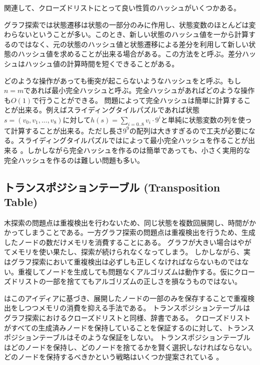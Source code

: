 関連して、クローズドリストにとって良い性質のハッシュがいくつかある。

グラフ探索では状態遷移は状態の一部分のみに作用し、状態変数のほとんどは変わらないということが多い。このとき、新しい状態のハッシュ値を一から計算するのではなく、元の状態のハッシュ値と状態遷移による差分を利用して新しい状態のハッシュ値を求めることが出来る場合がある。この方法をと呼ぶ。差分ハッシュはハッシュ値の計算時間を短くできることがある。

どのような操作があっても衝突が起こらないようなハッシュをと呼ぶ。もし$n = m$であれば最小完全ハッシュと呼ぶ。完全ハッシュがあればどのような操作も$O(1)$で行うことができる。
問題によって完全ハッシュは簡単に計算することが出来る。例えばスライディングタイルパズルであれば状態$s = (v_0, v_1,...,v_8)$に対して$h(s) = \sum_{i = 0..8} v_i \cdot 9^i$と単純に状態変数の列を使って計算することが出来る。ただし長さ$9^9$の配列は大きすぎるので工夫が必要になる。スライディングタイルパズルではによって最小完全ハッシュを作ることが出来る \cite{korf2005large}。しかしながら完全ハッシュを作るのは簡単であっても、小さく実用的な完全ハッシュを作るのは難しい問題も多い。


\subsection{トランスポジションテーブル (Transposition Table)}

木探索の問題点は重複検出を行わないため、同じ状態を複数回展開し、時間がかかってしまうことである。一方グラフ探索の問題点は重複検出を行うため、生成したノードの数だけメモリを消費することにある。
グラフが大きい場合はやがてメモリを使い果たし、探索が続けられなくなってしまう。
しかしながら、実はグラフ探索において重複検出は必ずしも正しくなければならないものではない。重複してノードを生成しても問題なくアルゴリズムは動作する。仮にクローズドリストの一部を捨ててもアルゴリズムの正しさを損なうものではない。

はこのアイディアに基づき、展開したノードの一部のみを保存することで重複検出をしつつメモリの消費を抑える手法である。
トランスポジションテーブルはグラフ探索におけるクローズドリストと同様、辞書である。
クローズドリストがすべての生成済みノードを保持していることを保証するのに対して、トランスポジションテーブルはそのような保証をしない。
トランスポジションテーブルはどのノードを保持し、どのノードを捨てるかを賢く選択しなければならない。どのノードを保持するべきかという戦略はいくつか提案されている \cite{breuker1994replacement,akagi2010transposition}。

